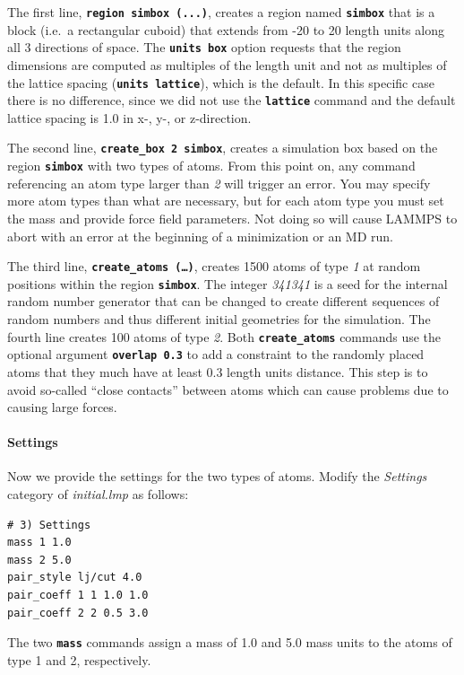 \documentclass[9pt,tutorial]{livecoms}
\newcommand{\lmpcmd}[1]{\texttt{\normalsize\bfseries\textcolor{command}{#1}}}
\begin{document}
The first line, \lmpcmd{region simbox (...)}, creates a region
named \lmpcmd{simbox} that is a block (i.e.~a rectangular
cuboid) that extends from -20 to 20 length units along all 3 directions
of space.  The \lmpcmd{units box} option requests that the region
dimensions are computed as multiples of the length unit and not as
multiples of the lattice spacing (\lmpcmd{units lattice}), which is the
default.  In this specific case there is no difference, since we did not
use the \lmpcmd{lattice} command and the default lattice spacing is 1.0
in x-, y-, or z-direction.

The second line, \lmpcmd{create\_box 2 simbox}, creates a simulation box
based on the region \lmpcmd{simbox} with two types of atoms.  From this
point on, any command referencing an atom type larger than \textit{2}
will trigger an error.  You may specify more atom types than what are
necessary, but for each atom type you must set the mass and provide
force field parameters. Not doing so will cause LAMMPS to abort with an
error at the beginning of a minimization or an MD run.

The third line, \lmpcmd{create\_atoms (\dots)}, creates 1500 atoms of type
\textit{1} at random positions within the region
\lmpcmd{simbox}.  The integer \textit{341341} is a seed for the
internal random number generator that can be changed to create different
sequences of random numbers and thus different initial geometries for
the simulation.  The fourth line creates 100 atoms of type \textit{2}.
Both \lmpcmd{create\_atoms} commands use the optional argument
\lmpcmd{overlap 0.3} to add a constraint to the randomly placed atoms
that they much have at least 0.3 length units distance.  This step is to
avoid so-called ``close contacts'' between atoms which can cause
problems due to causing large forces.

\paragraph{Settings}
Now we provide the settings for the two types of atoms.  Modify the
\textit{Settings} category of \textit{initial.lmp} as follows:
\begin{lstlisting}
# 3) Settings
mass 1 1.0
mass 2 5.0
pair_style lj/cut 4.0
pair_coeff 1 1 1.0 1.0
pair_coeff 2 2 0.5 3.0
\end{lstlisting}

The two \lmpcmd{mass} commands assign a mass of 1.0 and 5.0 mass units
to the atoms of type 1 and 2, respectively.
\end{document}
